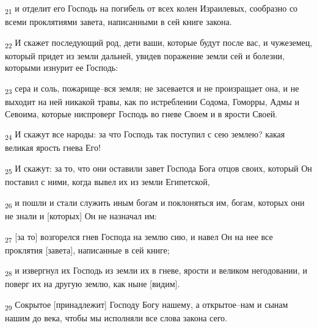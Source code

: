 \begin{tcolorbox}
\textsubscript{21} и отделит его Господь на погибель от всех колен Израилевых, сообразно со всеми проклятиями завета, написанными в сей книге закона.
\end{tcolorbox}
\begin{tcolorbox}
\textsubscript{22} И скажет последующий род, дети ваши, которые будут после вас, и чужеземец, который придет из земли дальней, увидев поражение земли сей и болезни, которыми изнурит ее Господь:
\end{tcolorbox}
\begin{tcolorbox}
\textsubscript{23} сера и соль, пожарище--вся земля; не засевается и не произращает она, и не выходит на ней никакой травы, как по истреблении Содома, Гоморры, Адмы и Севоима, которые ниспроверг Господь во гневе Своем и в ярости Своей.
\end{tcolorbox}
\begin{tcolorbox}
\textsubscript{24} И скажут все народы: за что Господь так поступил с сею землею? какая великая ярость гнева Его!
\end{tcolorbox}
\begin{tcolorbox}
\textsubscript{25} И скажут: за то, что они оставили завет Господа Бога отцов своих, который Он поставил с ними, когда вывел их из земли Египетской,
\end{tcolorbox}
\begin{tcolorbox}
\textsubscript{26} и пошли и стали служить иным богам и поклоняться им, богам, которых они не знали и [которых] Он не назначал им:
\end{tcolorbox}
\begin{tcolorbox}
\textsubscript{27} [за то] возгорелся гнев Господа на землю сию, и навел Он на нее все проклятия [завета], написанные в сей книге;
\end{tcolorbox}
\begin{tcolorbox}
\textsubscript{28} и извергнул их Господь из земли их в гневе, ярости и великом негодовании, и поверг их на другую землю, как ныне [видим].
\end{tcolorbox}
\begin{tcolorbox}
\textsubscript{29} Сокрытое [принадлежит] Господу Богу нашему, а открытое--нам и сынам нашим до века, чтобы мы исполняли все слова закона сего.
\end{tcolorbox}
